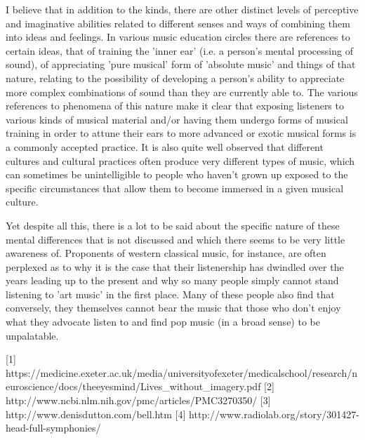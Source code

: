 \documentclass[]{article}
\begin{document}
I believe that in addition to the kinds, there are other distinct levels of perceptive and imaginative abilities related to different senses and ways of combining them into ideas and feelings. In various music education circles there are references to certain ideas, that of training the 'inner ear' (i.e. a person's mental processing of sound), of appreciating 'pure musical' form of 'absolute music' and things of that nature, relating to the possibility of developing a person's ability to appreciate more complex combinations of sound than they are currently able to. The various references to phenomena of this nature make it clear that exposing listeners to various kinds of musical material and/or having them undergo forms of musical training in order to attune their ears to more advanced or exotic musical forms is a commonly accepted practice. It is also quite well observed that different cultures and cultural practices often produce very different types of music, which can sometimes be unintelligible to people who haven't grown up exposed to the specific circumstances that allow them to become immersed in a given musical culture.

Yet despite all this, there is a lot to be said about the specific nature of these mental differences that is not discussed and which there seems to be very little awareness of. Proponents of western classical music, for instance, are often perplexed as to why it is the case that their listenership has dwindled over the years leading up to the present and why so many people simply cannot stand listening to 'art music' in the first place. Many of these people also find that conversely, they themselves cannot bear the music that those who don't enjoy what they advocate listen to and find pop music (in a broad sense) to be unpalatable.

[1] https://medicine.exeter.ac.uk/media/universityofexeter/medicalschool/research/neuroscience/docs/theeyesmind/Lives_without_imagery.pdf
[2] http://www.ncbi.nlm.nih.gov/pmc/articles/PMC3270350/
[3] http://www.denisdutton.com/bell.htm
[4] http://www.radiolab.org/story/301427-head-full-symphonies/
\end{document}
